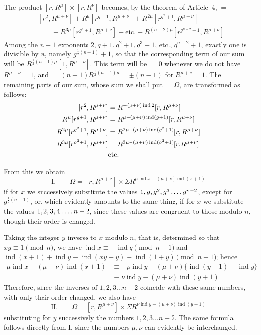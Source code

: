 \clearpage
{}
The product $[r,R^\mu]\times[r,R^\nu]$ becomes, by the theorem of Article~4, $=$
\[
\begin{aligned}
&[r^2,R^{\mu+\nu}]+R^\mu[r^{g+1},R^{\mu+\nu}]+R^{2\mu}[r^{g^2+1},R^{\mu+\nu}]\\
&\qquad+R^{3\mu}[r^{g^3+1},R^{\mu+\nu}]+\text{etc.}+R^{(n-2)\mu}[r^{g^{n-2}+1},R^{\mu+\nu}]
\end{aligned}
\]
Among the $n-1$ exponents $2,g+1,g^2+1,g^3+1$, etc., $g^{n-2}+1$, exactly one is divisible by $n$, namely $g^{\frac12(n-1)}+1$, so that the corresponding term of our sum will be $R^{\frac12(n-1)\mu}[1,R^{\mu+\nu}]$. This term will be $=0$ whenever we do not have $R^{\mu+\nu}=1$, and $=(n-1)R^{\frac12(n-1)\mu}=\pm(n-1)$ for $R^{\mu+\nu}=1$. The remaining parts of our sum, whose sum we shall put $=\Omega$, are transformed as follows:
\[
\begin{aligned}
\relax[r^2,R^{\mu+\nu}]&=R^{-(\mu+\nu)\operatorname{ind}2}[r,R^{\mu+\nu}]\\
R^\mu[r^{g+1},R^{\mu+\nu}]&=R^{\mu-(\mu+\nu)\operatorname{ind}(g+1)}[r,R^{\mu+\nu}]\\
R^{2\mu}[r^{g^2+1},R^{\mu+\nu}]&=R^{2\mu-(\mu+\nu)\operatorname{ind}(g^2+1)}[r,R^{\mu+\nu}]\\
R^{3\mu}[r^{g^3+1},R^{\mu+\nu}]&=R^{3\mu-(\mu+\nu)\operatorname{ind}(g^3+1)}[r.R^{\mu+\nu}]\\
&\text{etc.}
\end{aligned}
\]

From this we obtain
\begingroup{}
\[
\text{I.}\qquad\Omega=[r,R^{\mu+\nu}]\times\Sigma R^{\mu\operatorname{ind}x-(\mu+\nu)\operatorname{ind}(x+1)}
\]
\endgroup
if for $x$ we successively substitute the values $1,g,g^2,g^3\mathinner{.\,.\,.\,.} g^{n-2}$, except for $g^{\frac12(n-1)}$, or, which evidently amounts to the same thing, if for $x$ we substitute the values $1,2,3,4\mathinner{.\,.\,.\,.} n-2$, since these values are congruent to those modulo $n$, though their order is changed.

Taking the integer $y$ inverse to $x$ modulo $n$, that is, determined so that $xy\equiv1\pmod n$, we have $\operatorname{ind}x\equiv-\operatorname{ind}y\pmod{n-1}$ and $\operatorname{ind}(x+1)+\operatorname{ind}y\equiv\operatorname{ind}(xy+y)\equiv\operatorname{ind}(1+y)\pmod{n-1}$; hence
\[
\begin{aligned}
\mu\operatorname{ind}x-(\mu+\nu)\operatorname{ind}(x+1)&\equiv-\mu\operatorname{ind}y-(\mu+\nu)\{\operatorname{ind}(y+1)-\operatorname{ind}y\}\\
&\equiv\nu\operatorname{ind}y-(\mu+\nu)\operatorname{ind}(y+1)
\end{aligned}
\]
Therefore, since the inverses of $1,2,3\dots n-2$ coincide with these same numbers, with only their order changed, we also have
\[
\text{II.}\qquad\Omega=[r,R^{\mu+\nu}]\times\Sigma R^{\nu\operatorname{ind}y-(\mu+\nu)\operatorname{ind}(y+1)}
\]
substituting for $y$ successively the numbers $1,2,3\dots n-2$. The same formula follows directly from I, since the numbers $\mu,\nu$ can evidently be interchanged.

